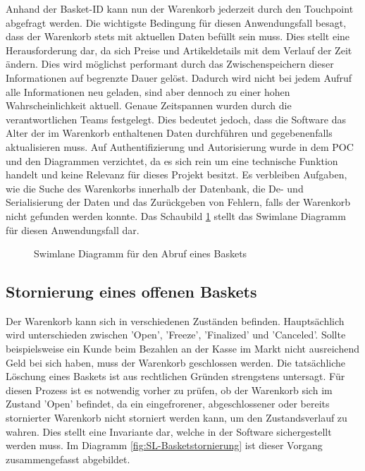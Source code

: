 Anhand der Basket-ID kann nun der Warenkorb jederzeit durch den Touchpoint abgefragt werden. Die wichtigste Bedingung für diesen Anwendungsfall besagt, dass der Warenkorb stets mit aktuellen Daten befüllt sein muss. Dies stellt eine Herausforderung dar, da sich Preise und Artikeldetails mit dem Verlauf der Zeit ändern. Dies wird möglichst performant durch das Zwischenspeichern dieser Informationen auf begrenzte Dauer gelöst. Dadurch wird nicht bei jedem Aufruf alle Informationen neu geladen, sind aber dennoch zu einer hohen Wahrscheinlichkeit aktuell. Genaue Zeitspannen wurden durch die verantwortlichen Teams festgelegt. Dies bedeutet jedoch, dass die Software das Alter der im Warenkorb enthaltenen Daten durchführen und gegebenenfalls aktualisieren muss. Auf Authentifizierung und Autorisierung wurde in dem POC und den Diagrammen verzichtet, da es sich rein um eine technische Funktion handelt und keine Relevanz für dieses Projekt besitzt. Es verbleiben Aufgaben, wie die Suche des Warenkorbs innerhalb der Datenbank, die De- und Serialisierung der Daten und das Zurückgeben von Fehlern, falls der Warenkorb nicht gefunden werden konnte. Das Schaubild \ref{fig:SL-Basketabruf} stellt das Swimlane Diagramm für diesen Anwendungsfall dar.

\begin{figure}[htbp]
	\centering
	
	\caption{Swimlane Diagramm für den Abruf eines Baskets}
	\label{fig:SL-Basketabruf}
\end{figure}

\subsection{Stornierung eines offenen Baskets}

Der Warenkorb kann sich in verschiedenen Zuständen befinden. Hauptsächlich wird unterschieden zwischen 'Open', 'Freeze', 'Finalized' und 'Canceled'. Sollte beispielsweise ein Kunde beim Bezahlen an der Kasse im Markt nicht ausreichend Geld bei sich haben, muss der Warenkorb geschlossen werden. Die tatsächliche Löschung eines Baskets ist aus rechtlichen Gründen strengstens untersagt. Für diesen Prozess ist es notwendig vorher zu prüfen, ob der Warenkorb sich im Zustand 'Open' befindet, da ein eingefrorener, abgeschlossener oder bereits stornierter Warenkorb nicht storniert werden kann, um den Zustandsverlauf zu wahren. Dies stellt eine Invariante dar, welche in der Software sichergestellt werden muss. Im Diagramm \ref{fig:SL-Basketstornierung} ist dieser Vorgang zusammengefasst abgebildet.

